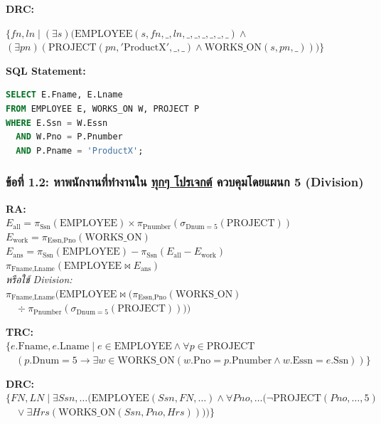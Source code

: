 \documentclass[a4paper,12pt]{article}
\begin{document}
\textbf{DRC:}\\
\begin{small}
$ \{ fn, ln \mid (\exists s)(\text{EMPLOYEE}(s, fn, \_, ln, \_, \_, \_, \_, \_, \_) \land $ \\
$ (\exists pn)(\text{PROJECT}(pn, '\text{ProductX}', \_, \_) \land \text{WORKS\_ON}(s, pn, \_))) \} $
\end{small}

\textbf{SQL Statement:}
\begin{lstlisting}[language=SQL]
SELECT E.Fname, E.Lname
FROM EMPLOYEE E, WORKS_ON W, PROJECT P
WHERE E.Ssn = W.Essn 
  AND W.Pno = P.Pnumber
  AND P.Pname = 'ProductX';
\end{lstlisting}

\vspace{0.3cm}
\subsubsection*{ข้อที่ 1.2: หาพนักงานที่ทำงานใน \underline{ทุกๆ โปรเจกต์} ควบคุมโดยแผนก 5 (Division)}

\textbf{RA:}\\
$ E_{\text{all}} = \pi_{\text{Ssn}}(\text{EMPLOYEE}) \times \pi_{\text{Pnumber}}(\sigma_{\text{Dnum}=5}(\text{PROJECT})) $ \\
$ E_{\text{work}} = \pi_{\text{Essn}, \text{Pno}}(\text{WORKS\_ON}) $ \\
$ E_{\text{ans}} = \pi_{\text{Ssn}}(\text{EMPLOYEE}) - \pi_{\text{Ssn}}(E_{\text{all}} - E_{\text{work}}) $ \\
$ \pi_{\text{Fname}, \text{Lname}} (\text{EMPLOYEE} \bowtie E_{\text{ans}}) $ \\
\textit{หรือใช้ Division:}\\
$ \pi_{\text{Fname}, \text{Lname}} \big(\text{EMPLOYEE} \bowtie ( \pi_{\text{Essn}, \text{Pno}}(\text{WORKS\_ON}) $ \\
$ \quad \div \pi_{\text{Pnumber}}(\sigma_{\text{Dnum}=5}(\text{PROJECT})) ) \big) $

\textbf{TRC:}\\
$ \{ e.\text{Fname}, e.\text{Lname} \mid e \in \text{EMPLOYEE} \land \forall p \in \text{PROJECT} $ \\
$ \quad (p.\text{Dnum}=5 \rightarrow \exists w \in \text{WORKS\_ON} (w.\text{Pno} = p.\text{Pnumber} \land w.\text{Essn} = e.\text{Ssn})) \} $

\textbf{DRC:}\\
$ \{ FN, LN \mid \exists Ssn, \dots (\text{EMPLOYEE}(Ssn, FN, \dots) \land \forall Pno, \dots (\neg \text{PROJECT}(Pno, \dots, 5) $ \\
$ \quad \lor \exists Hrs (\text{WORKS\_ON}(Ssn, Pno, Hrs)))) \} $
\end{document}
